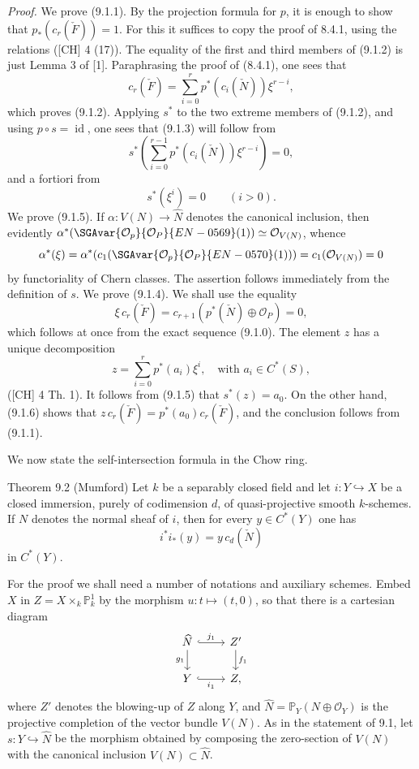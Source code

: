 \emph{Proof.} We prove (9.1.1). By the projection formula for $p$, it is enough to show that $p_*(c_r(\check F))=1$. For this it suffices to copy the proof of 8.4.1, using the relations ([CH] 4 (17)). The equality of the first and third members of (9.1.2) is just Lemma 3 of [1]. Paraphrasing the proof of (8.4.1), one sees that
\[
c_r(\check F)=\sum_{i=0}^r p^*(c_i(\check N))\xi^{r-i},
\tag{9.1.2 bis}
\]
which proves (9.1.2). Applying $s^*$ to the two extreme members of (9.1.2), and using $p\circ s=\operatorname{id}$, one sees that (9.1.3) will follow from
\[
s^*\left(\sum_{i=0}^{r-1}p^*(c_i(\check N))\xi^{r-i}\right)=0,
\]
and a fortiori from
\[
s^*(\xi^i)=0\qquad(i>0).
\tag{9.1.5}
\]
We prove (9.1.5). If $\alpha:V(N)\to\widehat N$ denotes the canonical inclusion, then evidently $\alpha^*(\SGAvar{\mathcal O_p}{\mathcal O_P}{EN-0569}(1))\simeq\mathcal O_{V(N)}$, whence
\[
\alpha^*(\xi)=\alpha^*(c_1(\SGAvar{\mathcal O_p}{\mathcal O_P}{EN-0570}(1)))=c_1(\mathcal O_{V(N)})=0
\]
by functoriality of Chern classes. The assertion follows immediately from the definition of $s$. We prove (9.1.4). We shall use the equality
\[
\xi\,c_r(\check F)=c_{r+1}(p^*(\check N)\oplus\mathcal O_P)=0,
\tag{9.1.6}
\]
which follows at once from the exact sequence (9.1.0). The element $z$ has a unique decomposition
\[
z=\sum_{i=0}^r p^*(a_i)\xi^i,\quad\text{with }a_i\in C^*(S),
\]
([CH] 4 Th. 1). It follows from (9.1.5) that $s^*(z)=a_0$. On the other hand, (9.1.6) shows that $z\,c_r(\check F)=p^*(a_0)c_r(\check F)$, and the conclusion follows from (9.1.1).

We now state the self-intersection formula in the Chow ring.

\begin{statement}{Theorem 9.2 (Mumford)}
Let $k$ be a separably closed field and let $i:Y\hookrightarrow X$ be a closed immersion, purely of codimension $d$, of quasi-projective smooth $k$-schemes. If $N$ denotes the normal sheaf of $i$, then for every $y\in C^*(Y)$ one has
\[
i^*i_*(y)=y\,c_d(\check N)
\]
in $C^*(Y)$.
\end{statement}

For the proof we shall need a number of notations and auxiliary schemes. Embed $X$ in $Z=X\times_k\mathbb P^1_k$ by the morphism $u:t\mapsto(t,0)$, so that there is a cartesian diagram
\[
\begin{tikzcd}
\widehat N \arrow[r,hook,"j_1"] \arrow[d,"g_1"'] & Z' \arrow[d,"f_1"]\\
Y \arrow[r,hook,"i_1"'] & Z ,
\end{tikzcd}
\]
where $Z'$ denotes the blowing-up of $Z$ along $Y$, and $\widehat N=\mathbb P_Y(N\oplus\mathcal O_Y)$ is the projective completion of the vector bundle $V(N)$. As in the statement of 9.1, let $s:Y\hookrightarrow\widehat N$ be the morphism obtained by composing the zero-section of $V(N)$ with the canonical inclusion $V(N)\subset\widehat N$.

